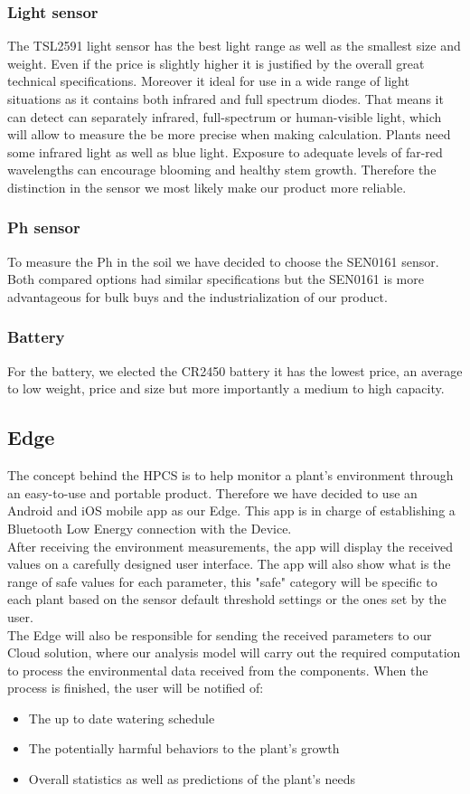 \subsubsection{Light sensor}
The TSL2591 light sensor has the best light range as well as the smallest size and weight. Even if the price is slightly higher it is justified by the overall great technical specifications. Moreover it ideal for use in a wide range of light situations as it contains both infrared and full spectrum diodes. That means it can detect can separately infrared, full-spectrum or human-visible light, which will allow to measure the be more precise when making calculation. Plants need some infrared light as well as blue light. Exposure to adequate levels of far-red wavelengths can encourage blooming and healthy stem growth. Therefore the distinction in the sensor we most likely make our product more reliable. 
\subsubsection{Ph sensor}
To measure the Ph in the soil we have decided to choose the SEN0161 sensor. Both compared options had similar specifications but the SEN0161 is more advantageous for bulk buys and the industrialization of our product.
\subsubsection{Battery}
For the battery, we elected the CR2450 battery it has the lowest price, an average to low weight, price and size but more importantly a medium to high capacity. 

\subsection{Edge}
The concept behind the HPCS is to help monitor a plant's environment through an easy-to-use and portable product. Therefore we have decided to use an Android and iOS mobile app as our Edge. This app is in charge of establishing a Bluetooth Low Energy connection with the Device. \\
After receiving the environment measurements, the app will display the received values on a carefully designed user interface. The app will also show what is the range of safe values for each parameter, this "safe" category will be specific to each plant based on the sensor default threshold settings or the ones set by the user. \\
The Edge will also be responsible for sending the received parameters to our Cloud solution, where our analysis model will carry out the required computation to process the environmental data received from the components. When the process is finished, the user will be notified of:
\begin{itemize}
    \item The up to date watering schedule
    \item The potentially harmful behaviors to the plant's growth
    \item Overall statistics as well as predictions of the plant's needs
\end{itemize}

